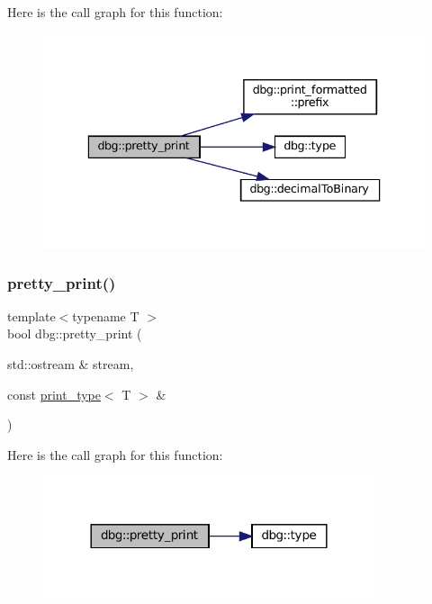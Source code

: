 Here is the call graph for this function\+:
\nopagebreak
\begin{figure}[H]
\begin{center}
\leavevmode
\includegraphics[width=336pt]{namespacedbg_a3f0682f5939ac9a18ba7ee86a5c63243_cgraph}
\end{center}
\end{figure}
\mbox{\label{namespacedbg_abb85fb70314b6ada2e66eebeafcd15bf}} 
\subsubsection{\texorpdfstring{pretty\+\_\+print()}{pretty\_print()}\hspace{0.1cm}{\footnotesize\ttfamily [15/19]}}
{\footnotesize\ttfamily template$<$typename T $>$ \\
bool dbg\+::pretty\+\_\+print (\begin{DoxyParamCaption}\item[{std\+::ostream \&}]{stream,  }\item[{const \hyperlink{structdbg_1_1print__type}{print\+\_\+type}$<$ T $>$ \&}]{ }\end{DoxyParamCaption})\hspace{0.3cm}{\ttfamily [inline]}}

Here is the call graph for this function\+:
\nopagebreak
\begin{figure}[H]
\begin{center}
\leavevmode
\includegraphics[width=276pt]{namespacedbg_abb85fb70314b6ada2e66eebeafcd15bf_cgraph}
\end{center}
\end{figure}
\mbox{\label{namespacedbg_a1212dc990d58f20efcf5d66eb4a5781c}} 
